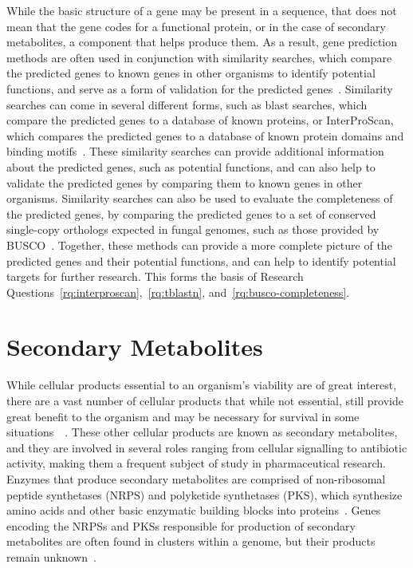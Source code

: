 While the basic structure of a gene may be present in a sequence, that does not mean that the gene codes for a functional protein, or in the case of secondary metabolites, a component that helps produce them. As a result, gene prediction methods are often used in conjunction with similarity searches, which compare the predicted genes to known genes in other organisms to identify potential functions, and serve as a form of validation for the predicted genes~\cite{loftus2003a}. 
Similarity searches can come in several different forms, such as blast searches, which compare the predicted genes to a database of known proteins, or InterProScan, which compares the predicted genes to a database of known protein domains and binding motifs~\cite{loftus2003a}. These similarity searches can provide additional information about the predicted genes, such as potential functions, and can also help to validate the predicted genes by comparing them to known genes in other organisms. Similarity searches can also be used to evaluate the completeness of the predicted genes, by comparing the predicted genes to a set of conserved single-copy orthologs expected in fungal genomes, such as those provided by BUSCO~\cite{manni2021a}. Together, these methods can provide a more complete picture of the predicted genes and their potential functions, and can help to identify potential targets for further research. This forms the basis of Research Questions~\ref{rq:interproscan},~\ref{rq:tblastn}, and~\ref{rq:busco-completeness}.

\section{Secondary Metabolites}
\label{lit:secondary-metabolites}

While cellular products essential to an organism's viability are
of great interest, there are a vast number of cellular products that while not
essential, still provide great benefit to the
organism and may be necessary for survival in some situations~\cite{Craney2013}~\cite{Mukherjee2012}. These other cellular products are known
 as secondary metabolites, and they are involved in several roles ranging 
 from cellular signalling to antibiotic activity, making them a frequent 
 subject of study in pharmaceutical research. Enzymes that produce 
 secondary metabolites are comprised of non-ribosomal peptide synthetases 
 (NRPS) and polyketide synthetases (PKS), which synthesize amino acids and 
 other basic enzymatic building blocks into proteins~\cite{komaki2020}. 
 Genes encoding the NRPSs and PKSs responsible for production of secondary 
 metabolites are often found in clusters within a genome, but their 
 products remain unknown~\cite{Mukherjee2012}. 
 
